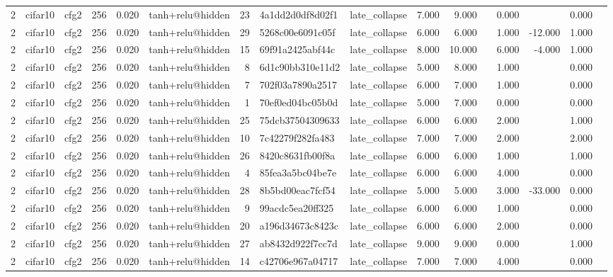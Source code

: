\begin{table}[htbp]
{\begin{tabular}{@{}rllrrlrllrrrrrrr@{}}
2 & cifar10 & cfg2 & 256 & 0.020 & tanh+relu@hidden & 23 & 4a1dd2d0df8d02f1 & late\_collapse & 7.000 & 9.000 &  & 0.000 &  & 0.000 &  \\
2 & cifar10 & cfg2 & 256 & 0.020 & tanh+relu@hidden & 29 & 5268c00e6091c05f & late\_collapse & 6.000 & 6.000 &  & 1.000 & -12.000 & 1.000 &  \\
2 & cifar10 & cfg2 & 256 & 0.020 & tanh+relu@hidden & 15 & 69f91a2425abf44c & late\_collapse & 8.000 & 10.000 &  & 6.000 & -4.000 & 1.000 &  \\
2 & cifar10 & cfg2 & 256 & 0.020 & tanh+relu@hidden & 8 & 6d1c90bb310e11d2 & late\_collapse & 5.000 & 8.000 &  & 1.000 &  & 0.000 &  \\
2 & cifar10 & cfg2 & 256 & 0.020 & tanh+relu@hidden & 7 & 702f03a7890a2517 & late\_collapse & 6.000 & 7.000 &  & 1.000 &  & 0.000 &  \\
2 & cifar10 & cfg2 & 256 & 0.020 & tanh+relu@hidden & 1 & 70ef0ed04bc05b0d & late\_collapse & 5.000 & 7.000 &  & 0.000 &  & 0.000 &  \\
2 & cifar10 & cfg2 & 256 & 0.020 & tanh+relu@hidden & 25 & 75dcb37504309633 & late\_collapse & 6.000 & 6.000 &  & 2.000 &  & 1.000 &  \\
2 & cifar10 & cfg2 & 256 & 0.020 & tanh+relu@hidden & 10 & 7c42279f282fa483 & late\_collapse & 7.000 & 7.000 &  & 2.000 &  & 2.000 &  \\
2 & cifar10 & cfg2 & 256 & 0.020 & tanh+relu@hidden & 26 & 8420c8631fb00f8a & late\_collapse & 6.000 & 6.000 &  & 1.000 &  & 1.000 &  \\
2 & cifar10 & cfg2 & 256 & 0.020 & tanh+relu@hidden & 4 & 85fea3a5bc04be7e & late\_collapse & 6.000 & 6.000 &  & 4.000 &  & 0.000 &  \\
2 & cifar10 & cfg2 & 256 & 0.020 & tanh+relu@hidden & 28 & 8b5bd00eac7fcf54 & late\_collapse & 5.000 & 5.000 &  & 3.000 & -33.000 & 0.000 &  \\
2 & cifar10 & cfg2 & 256 & 0.020 & tanh+relu@hidden & 9 & 99acdc5ea20ff325 & late\_collapse & 6.000 & 6.000 &  & 1.000 &  & 0.000 &  \\
2 & cifar10 & cfg2 & 256 & 0.020 & tanh+relu@hidden & 20 & a196d34673c8423c & late\_collapse & 6.000 & 6.000 &  & 2.000 &  & 0.000 &  \\
2 & cifar10 & cfg2 & 256 & 0.020 & tanh+relu@hidden & 27 & ab8432d922f7cc7d & late\_collapse & 9.000 & 9.000 &  & 0.000 &  & 1.000 &  \\
2 & cifar10 & cfg2 & 256 & 0.020 & tanh+relu@hidden & 14 & c42706e967a04717 & late\_collapse & 7.000 & 7.000 &  & 4.000 &  & 0.000 &  \\

\end{tabular}}
\end{table}
